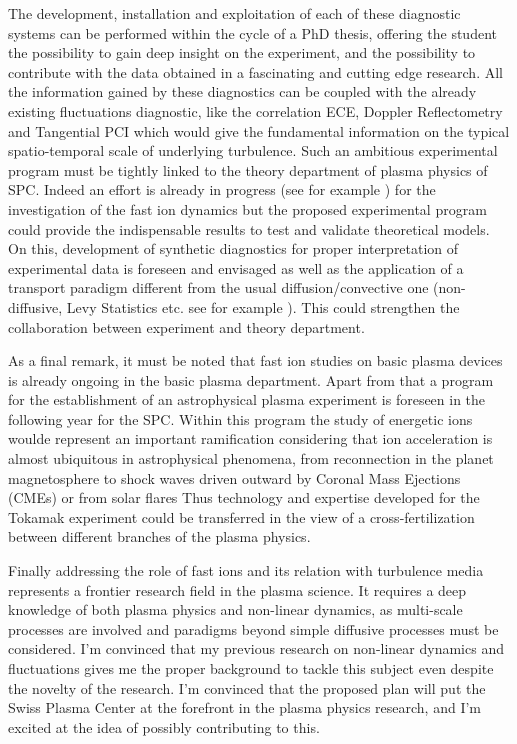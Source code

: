 \documentclass[12pt,a4paper]{article}
\begin{document}
The development, installation and exploitation of each of these 
diagnostic systems can be performed within the cycle of a PhD thesis, offering the
student the possibility to gain deep insight on the experiment, and
the possibility to contribute with the data obtained in a fascinating
and cutting edge research. All the information gained by these
diagnostics can be coupled with the already existing fluctuations
diagnostic, like the correlation ECE, Doppler Reflectometry and Tangential
PCI which would give the fundamental information on the typical
spatio-temporal scale of underlying turbulence. Such an ambitious
experimental program must be tightly linked to the theory department
of plasma physics of SPC. Indeed an effort is already in progress (see
for example \cite{Albergante:2011bj,Pfefferle:2014bk}) for
the investigation of the fast ion dynamics but the proposed
experimental program could provide the indispensable results to test
and validate theoretical models. On this,  development of synthetic
diagnostics for proper interpretation of experimental data is foreseen
and envisaged as well as the application of a transport paradigm different
from the usual diffusion/convective one (non-diffusive, Levy Statistics
etc. see for example \cite{Perrone:2013hp,Greco:2003fx}). This could strengthen the collaboration between
experiment and theory department. 

As a final remark, it must be noted that fast ion studies on basic
plasma devices is already ongoing in the basic plasma
department. Apart from that a program for the establishment of an
astrophysical plasma experiment is foreseen in the following year for
the SPC. 
Within this program the study of energetic ions woulde represent an 
important ramification considering that ion acceleration is almost ubiquitous in
astrophysical phenomena,  from reconnection in the planet
magnetosphere \cite{space-science-review} to shock waves driven
outward by Coronal Mass Ejections (CMEs) or from solar flares \cite{Reames:1999bu} 
Thus
technology and expertise developed for the Tokamak experiment could be
transferred in the view of a cross-fertilization between different
branches of the plasma physics.

Finally addressing the role of fast ions and its relation with
turbulence media represents a frontier research field in the
plasma science. It requires a deep knowledge of both plasma
physics and non-linear dynamics, as multi-scale processes are involved
and paradigms beyond simple diffusive processes must be considered. I'm
convinced that my previous research on non-linear dynamics and
fluctuations gives me the proper background to tackle this
subject even despite the novelty of the research. I'm convinced that
the proposed plan will put the Swiss Plasma Center at the forefront in
the plasma physics research, and I'm excited at the idea of possibly
contributing to this.
\clearpage
\printbibliography[title=Personal publications cited,notkeyword=others, prefixnumbers={A}, resetnumbers=true]
\printbibliography[title=Other Sources, keyword=others, prefixnumbers={B}, resetnumbers=true]
\end{document}
